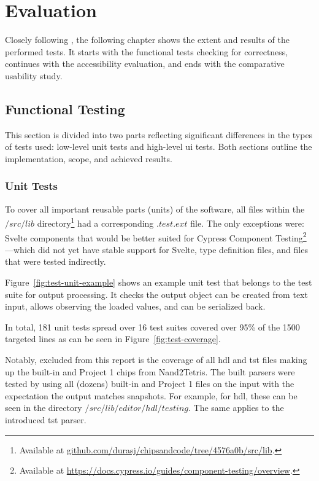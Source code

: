 \chapter{Evaluation}
\label{Evaluation}

Closely following , the following chapter shows the extent and results of the performed tests.
It starts with the functional tests checking for correctness, continues with the accessibility evaluation, and ends with the comparative usability study.

\section{Functional Testing}
\label{Evaluation-Tests}

This section is divided into two parts reflecting significant differences in the types of tests used: low-level unit tests and high-level \gls{ui} tests.
Both sections outline the implementation, scope, and achieved results.

\subsection{Unit Tests}
\label{sec:evaluation-unit-tests}

To cover all important reusable parts (units) of the software, all files within the $/src/lib$ directory\footnote{Available at \href{https://github.com/durasj/chipsandcode/tree/4576a0b/src/lib}{github.com/durasj/chipsandcode/tree/4576a0b/src/lib}.} had a corresponding $.test.ext$ file.
The only exceptions were: Svelte components that would be better suited for Cypress Component Testing\footnote{Available at \url{https://docs.cypress.io/guides/component-testing/overview}.}---which did not yet have stable support for Svelte, type definition files, and files that were tested indirectly.

Figure~\ref{fig:test-unit-example} shows an example unit test that belongs to the test suite for output processing.
It checks the output object can be created from text input, allows observing the loaded values, and can be serialized back.

In total, 181 unit tests spread over 16 test suites covered over 95\% of the 1500 targeted lines as can be seen in Figure~\ref{fig:test-coverage}.

Notably, excluded from this report is the coverage of all \gls{hdl} and \gls{tst} files making up the built-in and Project 1 chips from Nand2Tetris.
The built parsers were tested by using all (dozens) built-in and Project 1 files on the input with the expectation the output matches snapshots.
For example, for \gls{hdl}, these can be seen in the directory $/src/lib/editor/hdl/testing$.
The same applies to the introduced \gls{tst} parser.

